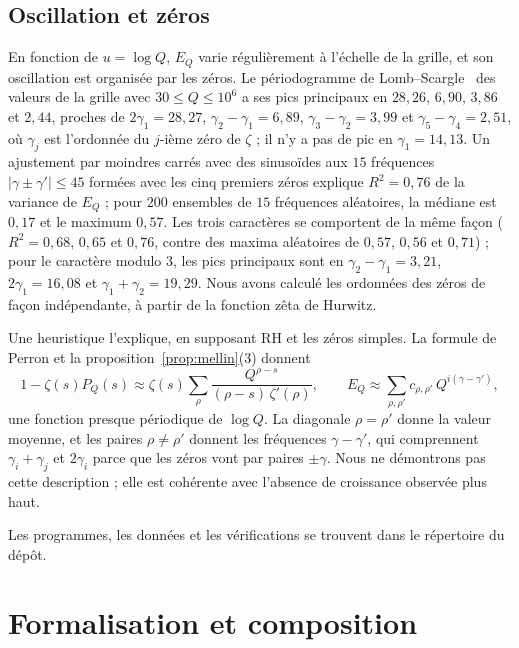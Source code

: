 \documentclass[11pt,a4paper]{amsart}
\theoremstyle{definition}
\theoremstyle{remark}
\begin{document}
\subsection*{Oscillation et z\'eros}
En fonction de $u=\log Q$, $E_Q$ varie r\'eguli\`erement \`a l'\'echelle de la grille, et son oscillation est organis\'ee par les z\'eros. Le p\'eriodogramme de Lomb--Scargle~\cite{Lomb,Scargle} des valeurs de la grille avec $30\le Q\le10^6$ a ses pics principaux en $28{,}26$, $6{,}90$, $3{,}86$ et $2{,}44$, proches de $2\gamma_1=28{,}27$, $\gamma_2-\gamma_1=6{,}89$, $\gamma_3-\gamma_2=3{,}99$ et $\gamma_5-\gamma_4=2{,}51$, o\`u $\gamma_j$ est l'ordonn\'ee du $j$-i\`eme z\'ero de $\zeta$ ; il n'y a pas de pic en $\gamma_1=14{,}13$. Un ajustement par moindres carr\'es avec des sinuso\"ides aux $15$ fr\'equences $|\gamma\pm\gamma'|\le45$ form\'ees avec les cinq premiers z\'eros explique $R^2=0{,}76$ de la variance de $E_Q$ ; pour $200$ ensembles de $15$ fr\'equences al\'eatoires, la m\'ediane est $0{,}17$ et le maximum $0{,}57$. Les trois caract\`eres se comportent de la m\^eme fa\c{c}on ($R^2=0{,}68$, $0{,}65$ et $0{,}76$, contre des maxima al\'eatoires de $0{,}57$, $0{,}56$ et $0{,}71$) ; pour le caract\`ere modulo $3$, les pics principaux sont en $\gamma_2-\gamma_1=3{,}21$, $2\gamma_1=16{,}08$ et $\gamma_1+\gamma_2=19{,}29$. Nous avons calcul\'e les ordonn\'ees des z\'eros de fa\c{c}on ind\'ependante, \`a partir de la fonction z\^eta de Hurwitz.

Une heuristique l'explique, en supposant RH et les z\'eros simples. La formule de Perron et la proposition~\ref{prop:mellin}(3) donnent
\[
1-\zeta(s)P_Q(s)\approx\zeta(s)\sum_\rho\frac{Q^{\rho-s}}{(\rho-s)\,\zeta'(\rho)},\qquad
E_Q\approx\sum_{\rho,\rho'}c_{\rho,\rho'}\,Q^{i(\gamma-\gamma')},
\]
une fonction presque p\'eriodique de $\log Q$. La diagonale $\rho=\rho'$ donne la valeur moyenne, et les paires $\rho\ne\rho'$ donnent les fr\'equences $\gamma-\gamma'$, qui comprennent $\gamma_i+\gamma_j$ et $2\gamma_i$ parce que les z\'eros vont par paires $\pm\gamma$. Nous ne d\'emontrons pas cette description ; elle est coh\'erente avec l'absence de croissance observ\'ee plus haut.

Les programmes, les donn\'ees et les v\'erifications se trouvent dans le r\'epertoire  du d\'ep\^ot.

\section{Formalisation et composition}\label{sec:formal}
\end{document}
